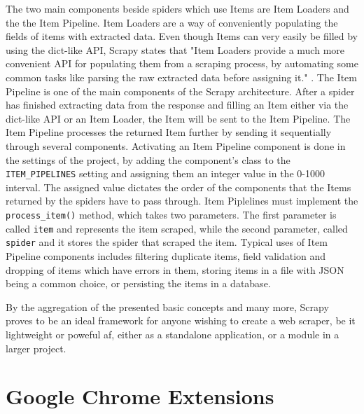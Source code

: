 \documentclass[12pt,a4paper,twoside]{report}
\begin{document}
The two main components beside spiders which use Items are Item Loaders and the the Item Pipeline. Item Loaders are a way of conveniently populating the fields of items with extracted data. Even though Items can very easily be filled by using the dict-like API, Scrapy states that "Item Loaders provide a much more convenient API for populating them from a scraping process, by automating some common tasks like parsing the raw extracted data before assigning it." \cite{scrapy_docs}. The Item Pipeline is one of the main components of the Scrapy architecture. After a spider has finished extracting data from the response and filling an Item either via the dict-like API or an Item Loader, the Item will be sent to the Item Pipeline. The Item Pipeline processes the returned Item further by sending it sequentially through several components. Activating an Item Pipeline component is done in the settings of the project, by adding the component's class to the \lstinline$ITEM_PIPELINES$ setting and assigning them an integer value in the 0-1000 interval. The assigned value dictates the order of the components that the Items returned by the spiders have to pass through. Item Piplelines must implement the \lstinline$process_item()$ method, which takes two parameters. The first parameter is called \lstinline$item$ and represents the item scraped, while the second parameter, called \lstinline$spider$ and it stores the spider that scraped the item. Typical uses of Item Pipeline components includes filtering duplicate items, field validation and dropping of items which have errors in them, storing items in a file with JSON being a common choice, or persisting the items in a database.

By the aggregation of the presented basic concepts and many more, Scrapy proves to be an ideal framework for anyone wishing to create a web scraper, be it lightweight or poweful af, either as a standalone application, or a module in a larger project.


\section{Google Chrome Extensions}
\end{document}
